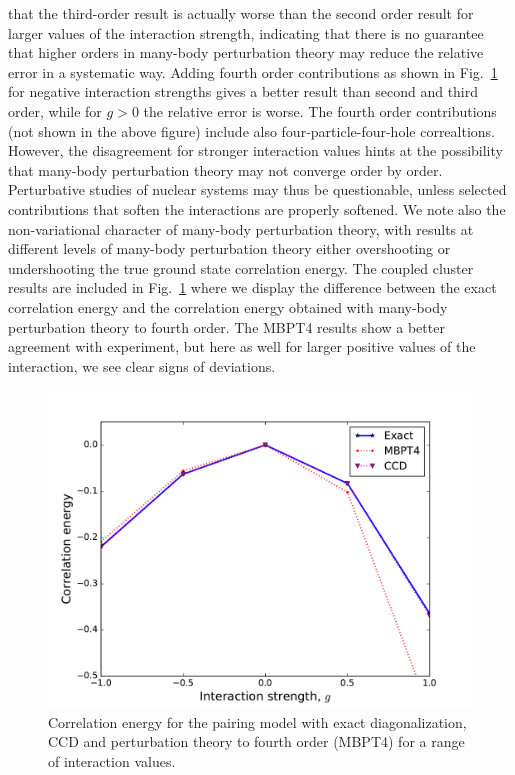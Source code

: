   that the third-order result is actually worse than the second order
  result for larger values of the interaction strength, indicating
  that there is no guarantee that higher orders in many-body
  perturbation theory may reduce the relative error in a systematic
  way.  Adding fourth order contributions as shown in Fig.~\ref{fig:pairingccmbpt4}
  for negative interaction strengths gives a
  better result than second and third order, while for $g>0$ the
  relative error is worse.  The fourth order contributions (not shown in the above figure) include also four-particle-four-hole correaltions.
However, the disagreement for stronger interaction values hints at  the possibility that many-body perturbation theory may not converge order by order.  Perturbative studies of nuclear systems may thus be questionable, unless selected contributions that soften the interactions are properly softened.   
 We note also the non-variational character
  of many-body perturbation theory, with results at different levels of many-body perturbation theory either
  overshooting or undershooting the true ground state correlation energy. 
The coupled cluster results are included in Fig.~\ref{fig:pairingccmbpt4} where we display the difference between the exact correlation energy and the correlation energy obtained with many-body perturbation theory to fourth order.  The MBPT4 results show a better agreement with experiment, but here as well for larger positive values of the interaction, we see clear signs of deviations. 
  \begin{figure}
    \includegraphics[width=\linewidth]{Chapter8-figures/CCDMBPT4theory.pdf}
    \caption{Correlation energy for the pairing model with exact diagonalization, CCD and perturbation theory to fourth order (MBPT4) for a range of interaction values.}
    \label{fig:pairingccmbpt4}
  \end{figure}
